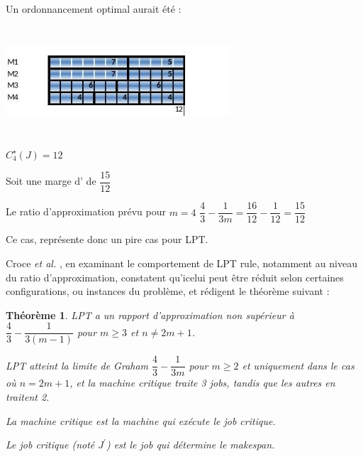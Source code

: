 \documentclass[a4paper,12pt]{report}
\theoremstyle{plain}				%
\newtheorem{theoreme1}{Théorème}	%
\theoremstyle{definition}				%
\begin{document}
\bigskip

\begin{minipage}{\linewidth}

\begin{flushleft}
Un ordonnancement optimal aurait été :
\end{flushleft}

{\centering
\includegraphics[width=8.334cm,height=4.034cm]{Biblio_PCmax_Rendu_exLPT_Rev2.jpg}
\par}


\begin{flushleft}
$C_4^{\star}(J)=12$
\end{flushleft}

\end{minipage}

Soit une marge d' de $\dfrac{15}{12}$

Le ratio d'approximation prévu pour $m=4$
$\dfrac{4}{3} - \dfrac{1}{3m}=\dfrac{16}{12} - \dfrac{1}{12}=\dfrac{15}{12}$

Ce cas, représente donc un pire cas pour LPT.

Croce \textit{et al.} \cite{della2018longest}, en examinant le comportement de LPT rule, notamment au niveau du ratio d'approximation, constatent qu'icelui peut être réduit selon certaines configurations, ou instances du problème, et rédigent le théorème suivant :

\bigskip

\begin{theoreme1}

LPT a un rapport d'approximation non supérieur à $\dfrac{4}{3} - \dfrac{1}{3(m-1)}$ pour $m \geq 3$ et $n \neq 2m+1$.

LPT atteint la limite de Graham $\dfrac{4}{3} - \dfrac{1}{3m}$ pour $m \geq 2$ et uniquement dans le cas où $n=2m+1$, et la machine critique traite 3 jobs, tandis que les autres en traitent 2.

La machine critique est la machine qui exécute le job critique.

Le job critique (noté $J^\prime$) est le job qui détermine le makespan.
\end{theoreme1}
\end{document}
